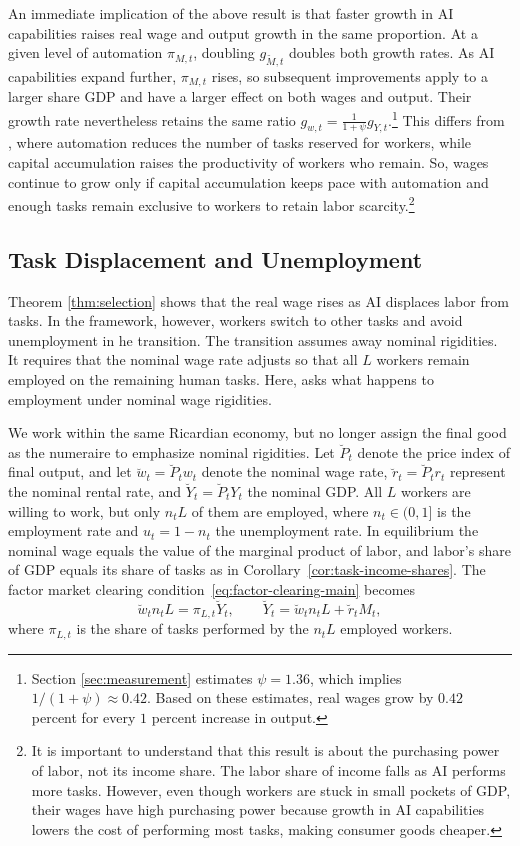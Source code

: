\documentclass[11pt]{article}
\begin{document}
An immediate implication of the above result is that faster growth
in AI capabilities raises real wage and output growth in the same
proportion. At a given level of automation $\pi_{M,t}$, doubling
$g_{\widetilde{M},t}$ doubles both growth rates. As AI capabilities
expand further, $\pi_{M,t}$ rises, so subsequent improvements apply
to a larger share GDP and have a larger effect on both wages and output.
Their growth rate nevertheless retains the same ratio $g_{w,t}=\frac{1}{1+\psi}g_{Y,t}.$\footnote{Section \eqref{sec:measurement} estimates $\psi=1.36$,
which implies $1/(1+\psi)\approx0.42$.
Based on these estimates, real wages grow by $0.42$
percent for every $1$ percent increase in output.} This differs from \citet{ks2024}, where automation reduces the number
of tasks reserved for workers, while capital accumulation raises the
productivity of workers who remain. So, wages continue to grow only
if capital accumulation keeps pace with automation and enough tasks
remain exclusive to workers to retain labor scarcity.\footnote{It is important to understand that this result is about the purchasing
power of labor, not its income share. The labor share of income falls
as AI performs more tasks. However, even though workers are stuck
in small pockets of GDP, their wages have high purchasing power because
growth in AI capabilities lowers the cost of performing most tasks,
making consumer goods cheaper.}

\subsection{Task Displacement and Unemployment}\label{sec:unemployment}

Theorem \ref{thm:selection} shows that the real wage rises as AI
displaces labor from tasks. In the framework, however, workers switch
to other tasks and avoid unemployment in he transition. The transition
assumes away nominal rigidities. It requires that the nominal wage
rate adjusts so that all $L$ workers remain employed on the remaining
human tasks. Here, asks what happens to employment under nominal wage
rigidities.

We work within the same Ricardian economy, but no longer assign the
final good as the numeraire to emphasize nominal rigidities. Let $\breve{P}_{t}$
denote the price index of final output, and let $\breve{w}_{t}=\breve{P}_{t}w_{t}$
denote the nominal wage rate, $\breve{r}_{t}=\breve{P}_{t}r_{t}$
represent the nominal rental rate, and $\breve{Y}_{t}=\breve{P}_{t}Y_{t}$
the nominal GDP. All $L$ workers are willing to work, but only $n_{t}L$
of them are employed, where $n_{t}\in(0,1]$ is the employment rate
and $u_{t}=1-n_{t}$ the unemployment rate. In equilibrium the nominal
wage equals the value of the marginal product of labor, and labor's
share of GDP equals its share of tasks as in Corollary~\ref{cor:task-income-shares}.
The factor market clearing condition~\eqref{eq:factor-clearing-main}
becomes
\begin{equation}
\breve{w}_{t}n_{t}L=\pi_{L,t}\breve{Y}_{t},\qquad\breve{Y}_{t}=\breve{w}_{t}n_{t}L+\breve{r}_{t}M_{t},\label{eq:ue-wage-bill}
\end{equation}
where $\pi_{L,t}$ is the share of tasks performed by the $n_{t}L$
employed workers.
\end{document}
